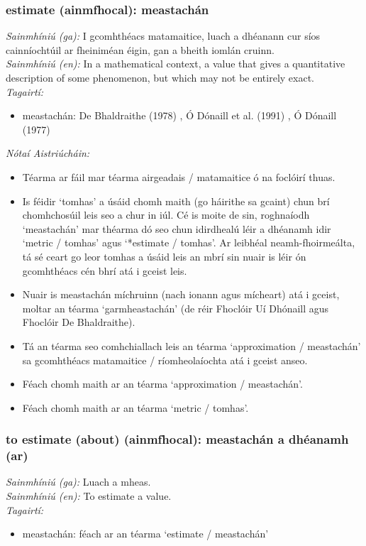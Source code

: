 \subsubsection*{estimate (ainmfhocal): meastachán}
 \noindent \textit{Sainmhíniú (ga):} I gcomhthéacs matamaitice, luach a dhéanann cur síos cainníochtúil ar fheiniméan éigin, gan a bheith iomlán cruinn.
\\
 \noindent \textit{Sainmhíniú (en):} In a mathematical context, a value that gives a quantitative description of some phenomenon, but which may not be entirely exact.
\\
 \noindent \textit{Tagairtí:}
\begin{itemize}
	\item meastachán: De Bhaldraithe (1978) \cite{de-bhaldraithe}, Ó Dónaill et al. (1991) \cite{focloir-beag}, Ó Dónaill (1977) \cite{odonaill}
\end{itemize}

 \noindent \textit{Nótaí Aistriúcháin:}
\begin{itemize}
	\item Téarma ar fáil mar téarma airgeadais / matamaitice ó na foclóirí thuas.
	\item Is féidir `tomhas' a úsáid chomh maith (go háirithe sa gcaint) chun brí chomhchosúil leis seo a chur in iúl. Cé is moite de sin, roghnaíodh `meastachán' mar théarma dó seo chun idirdhealú léir a dhéanamh idir `metric / tomhas' agus `*estimate / tomhas'. Ar leibhéal neamh-fhoirmeálta, tá sé ceart go leor tomhas a úsáid leis an mbrí sin nuair is léir ón gcomhthéacs cén bhrí atá i gceist leis.
	\item Nuair is meastachán míchruinn (nach ionann agus mícheart) atá i gceist, moltar an téarma `garmheastachán' (de réir Fhoclóir Uí Dhónaill agus Fhoclóir De  Bhaldraithe).
	\item Tá an téarma seo comhchiallach leis an téarma `approximation / meastachán' sa gcomhthéacs matamaitice / ríomheolaíochta atá i gceist anseo.
	\item Féach chomh maith ar an téarma `approximation / meastachán'.
	\item Féach chomh maith ar an téarma `metric / tomhas'.
\end{itemize}


\subsubsection*{to estimate (about) (ainmfhocal): meastachán a dhéanamh (ar)}
 \noindent \textit{Sainmhíniú (ga):} Luach a mheas.
\\
 \noindent \textit{Sainmhíniú (en):} To estimate a value.
\\
 \noindent \textit{Tagairtí:}
\begin{itemize}
	\item meastachán: féach ar an téarma `estimate / meastachán'
\end{itemize}

